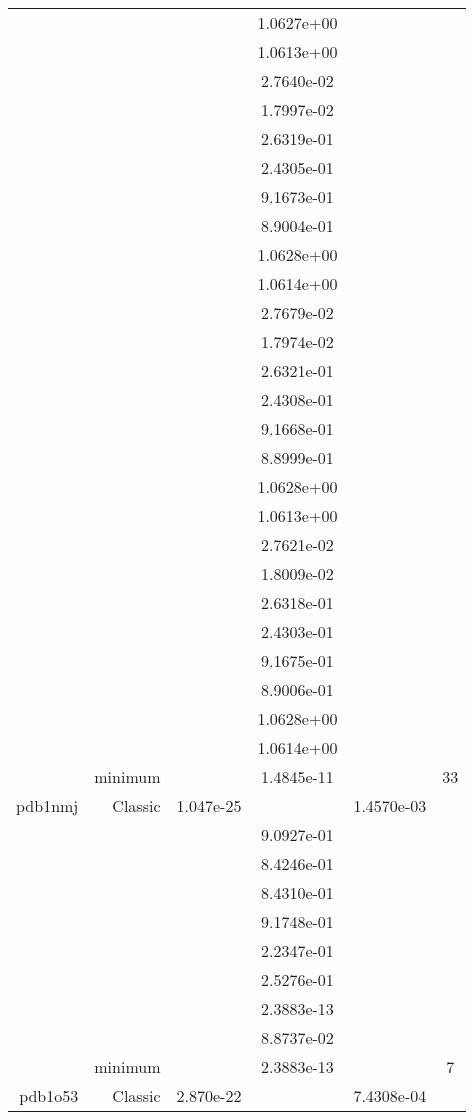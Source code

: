 \begin{xltabular}{\textwidth}{r|rS[table-format=1.3e+2]S[table-format=1.4e+2]S[table-format=1.4e+2]S[table-format=-1.5]}
&  &  & 1.0627e+00 & & \\
&  &  & 1.0613e+00 & & \\
&  &  & 2.7640e-02 & & \\
&  &  & 1.7997e-02 & & \\
&  &  & 2.6319e-01 & & \\
&  &  & 2.4305e-01 & & \\
&  &  & 9.1673e-01 & & \\
&  &  & 8.9004e-01 & & \\
&  &  & 1.0628e+00 & & \\
&  &  & 1.0614e+00 & & \\
&  &  & 2.7679e-02 & & \\
&  &  & 1.7974e-02 & & \\
&  &  & 2.6321e-01 & & \\
&  &  & 2.4308e-01 & & \\
&  &  & 9.1668e-01 & & \\
&  &  & 8.8999e-01 & & \\
&  &  & 1.0628e+00 & & \\
&  &  & 1.0613e+00 & & \\
&  &  & 2.7621e-02 & & \\
&  &  & 1.8009e-02 & & \\
&  &  & 2.6318e-01 & & \\
&  &  & 2.4303e-01 & & \\
&  &  & 9.1675e-01 & & \\
&  &  & 8.9006e-01 & & \\
&  &  & 1.0628e+00 & & \\
&  &  & 1.0614e+00 & & \\
& minimum &  & 1.4845e-11 & & 33 \\  \addlinespace
pdb1nmj & Classic & 1.047e-25 &  & 1.4570e-03 & \\
&  &  & 9.0927e-01 & & \\
&  &  & 8.4246e-01 & & \\
&  &  & 8.4310e-01 & & \\
&  &  & 9.1748e-01 & & \\
&  &  & 2.2347e-01 & & \\
&  &  & 2.5276e-01 & & \\
&  &  & 2.3883e-13 & & \\
&  &  & 8.8737e-02 & & \\
& minimum &  & 2.3883e-13 & & 7 \\  \addlinespace
pdb1o53 & Classic & 2.870e-22 &  & 7.4308e-04 & \\

\end{xltabular}
